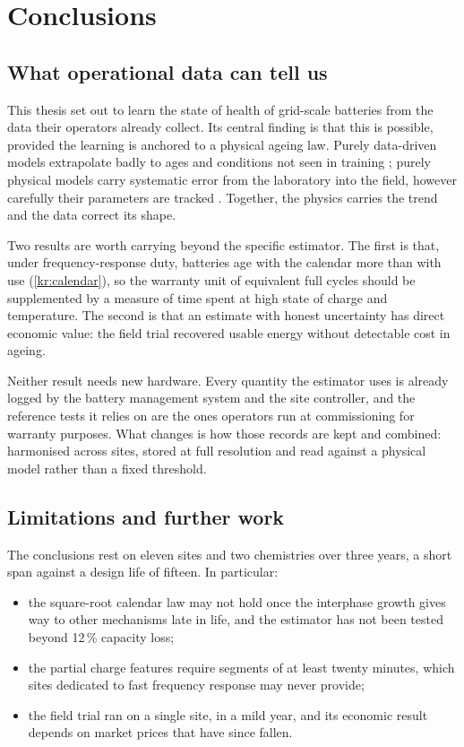 \chapter{Conclusions}
\label{ch:conclusions}

\section{What operational data can tell us}
\label{sec:summary}

This thesis set out to learn the state of health of grid-scale batteries
from the data their operators already collect. Its central finding is
that this is possible, provided the learning is anchored to a physical
ageing law. Purely data-driven models extrapolate badly to ages and
conditions not seen in training \parencite{severson2019data}; purely physical models carry systematic
error from the laboratory into the field, however carefully their parameters are tracked \parencite{plett2004ekf}. Together, the physics carries
the trend and the data correct its shape.

Two results are worth carrying beyond the specific estimator. The first
is that, under frequency-response duty, batteries age with the calendar
more than with use (\cref{kr:calendar}), so the warranty unit of
equivalent full cycles should be supplemented by a measure of time spent
at high state of charge and temperature. The second is that an estimate
with honest uncertainty has direct economic value: the field trial
recovered usable energy without detectable cost in ageing.

Neither result needs new hardware. Every quantity the estimator uses is
already logged by the battery management system and the site controller,
and the reference tests it relies on are the ones operators run at
commissioning for warranty purposes. What changes is how those records
are kept and combined: harmonised across sites, stored at full resolution
and read against a physical model rather than a fixed threshold.

\section{Limitations and further work}
\label{sec:limits}

The conclusions rest on eleven sites and two chemistries over three
years, a short span against a design life of fifteen. In particular:

\begin{itemize}
  \item the square-root calendar law may not hold once the
    interphase growth gives way to other mechanisms late in life, and
    the estimator has not been tested beyond 12\,\% capacity loss;
  \item the partial charge features require segments of at least twenty
    minutes, which sites dedicated to fast frequency response may never
    provide;
  \item the field trial ran on a single site, in a mild year, and its
    economic result depends on market prices that have since fallen.
\end{itemize}

